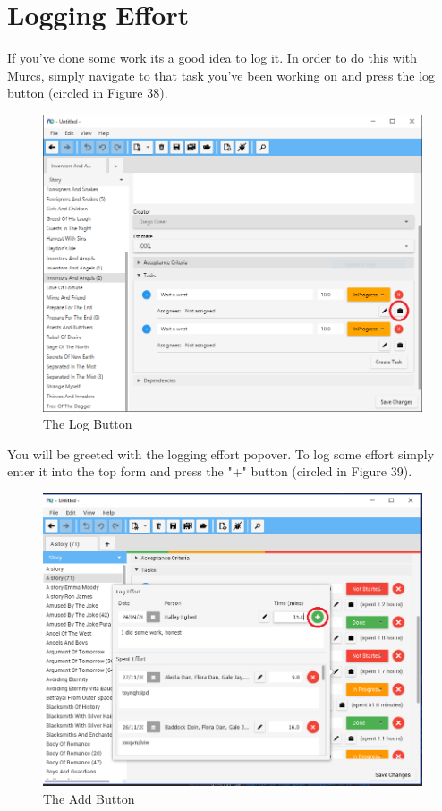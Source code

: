 \section{Logging Effort}

If you've done some work its a good idea to log it. In order to do this with Murcs, simply navigate to that task you've been working on and press the log button (circled in Figure 38).

\begin{figure}[H]
\centering
\includegraphics[width=\textwidth]{images/screenshots/logging1.PNG}
\caption{The Log Button}
\label{fig:new_project}
\end{figure}

You will be greeted with the logging effort popover. To log some effort simply enter it into the top form and press the "+" button (circled in Figure 39). 

\begin{figure}[H]
\centering
\includegraphics[width=\textwidth]{images/screenshots/logging3.png}
\caption{The Add Button}
\label{fig:new_project}
\end{figure}

